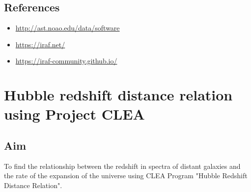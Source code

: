 \documentclass[letterpaper,11pt]{report}
\begin{document}
\section{References}
\begin{itemize}
    \item \href{http://ast.noao.edu/data/software}{http://ast.noao.edu/data/software}
    \item \href{https://iraf.net/}{https://iraf.net/}
    \item \href{https://iraf-community.github.io/}{https://iraf-community.github.io/}
\end{itemize}

\chapter{Hubble redshift distance relation using Project CLEA}

\section{Aim}
To find the relationship between the redshift in spectra of distant galaxies and the rate of the expansion of the universe using CLEA Program "Hubble Redshift Distance Relation".
\end{document}
